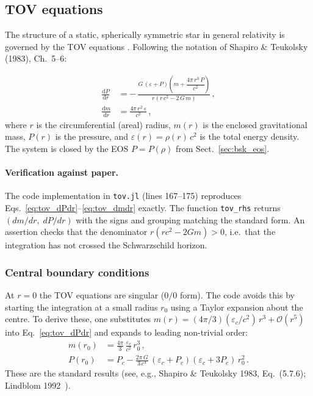\subsection{TOV equations}
\label{sec:tov}

The structure of a static, spherically symmetric star in general relativity is
governed by the TOV equations
\cite{Tolman1939,OppenheimerVolkoff1939,ShapiroTeukolsky1983}.
Following the notation of Shapiro \& Teukolsky (1983), Ch.~5--6:

\begin{align}
  \frac{\mathrm{d}P}{\mathrm{d}r}
  &= -\,\frac{G\,(\varepsilon + P)\!
       \left(m + \dfrac{4\pi\,r^{3}\,P}{c^{2}}\right)}
       {r\!\left(r\,c^{2} - 2\,G\,m\right)}\,,
  \label{eq:tov_dPdr}\\[8pt]
  \frac{\mathrm{d}m}{\mathrm{d}r}
  &= \frac{4\pi\,r^{2}\,\varepsilon}{c^{2}}\,,
  \label{eq:tov_dmdr}
\end{align}
%
where $r$ is the circumferential (areal) radius, $m(r)$ is the enclosed
gravitational mass, $P(r)$ is the pressure, and
$\varepsilon(r)=\rho(r)\,c^{2}$ is the total energy density.  The system is
closed by the EOS $P=P(\rho)$ from Sect.~\ref{sec:bsk_eos}.

\paragraph{Verification against paper.}
The code implementation in \texttt{tov.jl} (lines 167--175) reproduces
Eqs.~\eqref{eq:tov_dPdr}--\eqref{eq:tov_dmdr} exactly.  The function
\texttt{tov\_rhs} returns $(dm/dr,\;dP/dr)$ with the signs and grouping
matching the standard form.  An assertion checks that the denominator
$r(rc^{2}-2Gm)>0$, i.e.\ that the integration has not crossed the
Schwarzschild horizon.

\subsubsection{Central boundary conditions}
\label{sec:central_bc}

At $r=0$ the TOV equations are singular ($0/0$ form).  The code avoids
this by starting the integration at a small radius $r_{0}$ using a
Taylor expansion about the centre.  To derive these, one substitutes
$m(r)=(4\pi/3)(\varepsilon_{c}/c^{2})\,r^{3}+\mathcal{O}(r^{5})$ into
Eq.~\eqref{eq:tov_dPdr} and expands to leading non-trivial order:
%
\begin{align}
  m(r_0) &= \frac{4\pi}{3}\,\frac{\varepsilon_{c}}{c^{2}}\,r_0^{3}\,,
  \label{eq:m_central}\\[6pt]
  P(r_0) &= P_{c} - \frac{2\pi\,G}{3\,c^{4}}\,
             (\varepsilon_{c}+P_{c})(\varepsilon_{c}+3P_{c})\,r_0^{2}\,.
  \label{eq:P_central}
\end{align}
%
These are the standard results (see, e.g., Shapiro \& Teukolsky 1983,
Eq.~(5.7.6); Lindblom 1992~\cite{Lindblom1992}).

